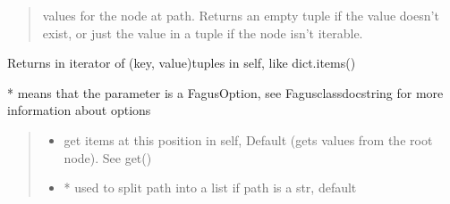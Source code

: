 \documentclass[a4paper,10pt,english]{sphinxmanual}
\begin{document}
\begin{fulllineitems}
\begin{fulllineitems}
\begin{quote}
\begin{description}
\begin{itemize}
\end{itemize}

\sphinxAtStartPar
values for the node at path. Returns an empty tuple if the value doesn’t exist, or just the value in a
tuple if the node isn’t iterable.

\end{description}\end{quote}

\end{fulllineitems}


\begin{fulllineitems}
\label{\detokenize{fagus.fagus:fagus.fagus.Fagus.items}}
\pysigstartsignatures
{}
\pysigstopsignatures
\sphinxAtStartPar
Returns in iterator of (key, value)\sphinxhyphen{}tuples in self, like dict.items()

\sphinxAtStartPar
* means that the parameter is a FagusOption, see Fagus\sphinxhyphen{}class\sphinxhyphen{}docstring for more information about options
\begin{quote}\begin{description}
\begin{itemize}
\item {}
\sphinxAtStartPar
{} \textendash{} get items at this position in self, Default  (gets values from the root node). See get()

\item {}
\sphinxAtStartPar
{} \textendash{} * used to split path into a list if path is a str, default 


\end{itemize}
\end{description}
\end{quote}
\end{fulllineitems}
\end{fulllineitems}
\end{document}
